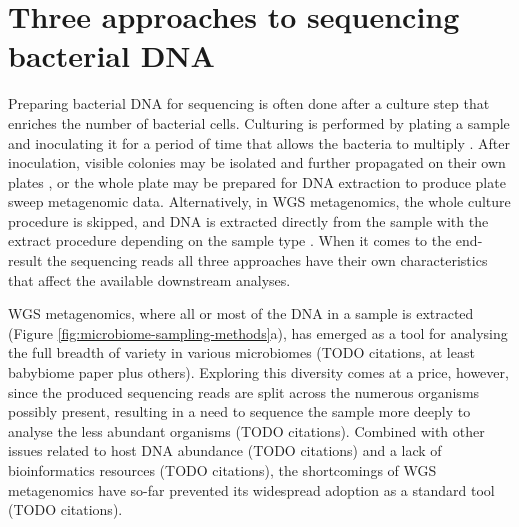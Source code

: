 \documentclass[officiallayout]{tktla}
\begin{document}
\section{Three approaches to sequencing bacterial DNA}
\label{three-approaches-to-metagenomics}


Preparing bacterial DNA for sequencing is often done after a
culture step that enriches the number of bacterial cells. Culturing
is performed by plating a sample and inoculating it for a period of
time that allows the bacteria to multiply
\citep{sanders2012aseptic}. After inoculation, visible colonies may be
isolated and further propagated on their own plates
\citep{sanders2012aseptic}, or the whole plate may be prepared for DNA
extraction to produce plate sweep metagenomic data. Alternatively, in
WGS metagenomics, the whole culture procedure is skipped, and DNA is
extracted directly from the sample with the extract procedure
depending on the sample type \citep{bachmann2018advances}. When it
comes to the end-result \textemdash{ } the sequencing reads \textemdash{ }
all three approaches have their own characteristics that affect the
available downstream analyses.


WGS metagenomics, where all or most of the DNA in a sample is
extracted (Figure \ref{fig:microbiome-sampling-methods}a), has emerged
as a tool for analysing the full breadth of variety in various
microbiomes (TODO citations, at least babybiome paper plus
others). Exploring this diversity comes at a price, however, since the
produced sequencing reads are split across the numerous organisms
possibly present, resulting in a need to sequence the sample more
deeply to analyse the less abundant organisms (TODO
citations). Combined with other issues related to host DNA abundance
(TODO citations) and a lack of bioinformatics resources (TODO
citations), the shortcomings of WGS metagenomics have so-far prevented
its widespread adoption as a standard tool (TODO citations).
\end{document}
